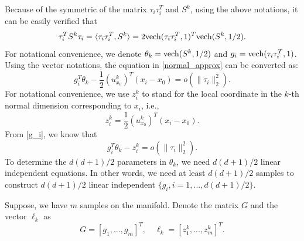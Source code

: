 \documentclass{article}
\theoremstyle{remark}
\begin{document}

Because of the symmetric of the matrix $\tau_i\tau_i^T$ and $S^k$, using the above notations, it can be easily verified that
\[
\tau_i^TS^k\tau_i = \langle \tau_i\tau_i^T, S^k\rangle =2{\rm vech}(\tau_i\tau_i^T,1)^T {\rm vech}(S^k,1/2).%
\]
For notational convenience, we denote $\theta_k = {\rm vech}(S^k,1/2)$ and $g_i = {\rm vech}(\tau_i\tau_i^T,1)$.
Using the vector notations, the equation in \eqref{normal_approx} can be converted as:
\begin{equation}\label{g_i}
g_i^T \theta_k  - \frac{1}{2}{(u^k_{x_0})}^T (x_i -x_0) = o(\|\tau_i\|_2^2).
\end{equation}
For notational convenience, we use $z_i^k$ to stand for the local coordinate in the $k$-th normal dimension corresponding to $x_i$, i.e.,
\[
z_i^k =  \frac{1}{2}{(u^k_{x_0})}^T (x_i -x_0). %
\] 
From \eqref{g_i}, we know that
\[
g_i^T \theta_k  - z_i^k= o(\|\tau_i\|_2^2).
\]
To determine the ${d(d+1)}/{2}$ parameters in $\theta_k$, we need ${d(d+1)}/{2}$ linear independent equations. In other words, we need at least ${d(d+1)}/{2}$ samples to construct ${d(d+1)}/{2}$ linear independent $\{g_i, i = 1,...,{d(d+1)}/{2}\}$. 

Suppose, we have $m$ samples on the manifold. Denote the matrix $G$ and the vector $\ell_k$ as
\[
G = [g_1,...,g_m]^T, \quad \ell_k = [z_1^k,..., z^k_m ]^T.
\]
\end{document}
